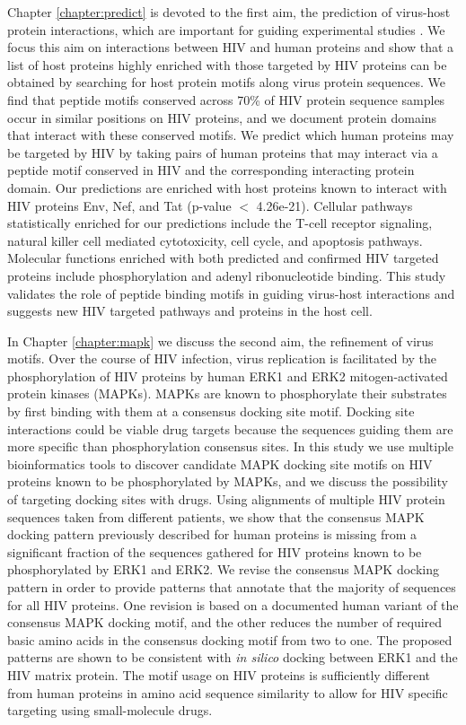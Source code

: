 Chapter \ref{chapter:predict} is devoted to the first aim, the
prediction of virus-host protein interactions, which are important for
guiding experimental studies
\cite{jansen2003bayesian,lee2004probabilistic}. We focus this aim on
interactions between HIV and human proteins and show that a list of
host proteins highly enriched with those targeted by HIV proteins can
be obtained by searching for host protein motifs along virus protein
sequences. We find that peptide motifs conserved across 70\% of HIV
protein sequence samples occur in similar positions on HIV proteins,
and we document protein domains that interact with these conserved
motifs. We predict which human proteins may be targeted by HIV by
taking pairs of human proteins that may interact via a peptide motif
conserved in HIV and the corresponding interacting protein domain. Our
predictions are enriched with host proteins known to interact with HIV
proteins Env, Nef, and Tat (p-value $<$ 4.26e-21). Cellular pathways
statistically enriched for our predictions include the T-cell receptor
signaling, natural killer cell mediated cytotoxicity, cell cycle, and
apoptosis pathways. Molecular functions enriched with both predicted
and confirmed HIV targeted proteins include phosphorylation and adenyl
ribonucleotide binding. This study validates the role of peptide
binding motifs in guiding virus-host interactions and suggests new HIV
targeted pathways and proteins in the host cell.

In Chapter \ref{chapter:mapk} we discuss the second aim, the
refinement of virus motifs. Over the course of HIV infection, virus
replication is facilitated by the phosphorylation of HIV proteins by
human ERK1 and ERK2 mitogen-activated protein kinases (MAPKs). MAPKs
are known to phosphorylate their substrates by first binding with them
at a consensus docking site motif. Docking site interactions could be
viable drug targets because the sequences guiding them are more
specific than phosphorylation consensus sites. In this study we use
multiple bioinformatics tools to discover candidate MAPK docking site
motifs on HIV proteins known to be phosphorylated by MAPKs, and we
discuss the possibility of targeting docking sites with drugs. Using
alignments of multiple HIV protein sequences taken from different
patients, we show that the consensus MAPK docking pattern previously
described for human proteins is missing from a significant fraction of
the sequences gathered for HIV proteins known to be phosphorylated by
ERK1 and ERK2. We revise the consensus MAPK docking pattern in order
to provide patterns that annotate that the majority of sequences for
all HIV proteins. One revision is based on a documented human variant
of the consensus MAPK docking motif, and the other reduces the number
of required basic amino acids in the consensus docking motif from two
to one. The proposed patterns are shown to be consistent with
\textit{in silico} docking between ERK1 and the HIV matrix
protein. The motif usage on HIV proteins is sufficiently different
from human proteins in amino acid sequence similarity to allow for HIV
specific targeting using small-molecule drugs.

